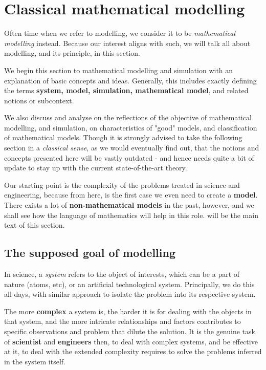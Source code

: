 \chapter{Classical mathematical modelling}
Often time when we refer to modelling, we consider it to be \textit{mathematical modelling} instead. Because our interest aligns with such, we will talk all about modelling, and its principle, in this section. 

We begin this section to mathematical modelling and simulation with an explanation of basic concepts and ideas. Generally, this includes exactly defining the terms \textbf{system, model, simulation, mathematical model}, and related notions or subcontext.  

We also discuss and analyse on the reflections of the objective of mathematical modelling, and simulation, on characteristics of "good" models, and classification of mathematical models. Though it is strongly advised to take the following section in a \textit{classical sense}, as we would eventually find out, that the notions and concepts presented here will be vastly outdated - and hence needs quite a bit of update to stay up with the current state-of-the-art theory. 

Our starting point is the complexity of the problems treated in science and engineering, because from here, is the first case we even need to create a \textbf{model}. There exists a lot of \textbf{non-mathematical models} in the past, however, and we shall see how the language of mathematics will help in this role. \cite{VeltenetalMathematicalModelling} will be the main text of this section. 

\section{The supposed goal of modelling}

In science, a \textit{system} refers to the object of interests, which can be a part of nature (atoms, etc), or an artificial technological system. Principally, we do this all days, with similar approach to isolate the problem into its respective system. 

The more \textbf{complex} a system is, the harder it is for dealing with the objects in that system, and the more intricate relationships and factors contributes to specific observations and problem that dilute the solution. It is the genuine task of \textbf{scientist} and \textbf{engineers} then, to deal with complex systems, and be effective at it, to deal with the extended complexity requires to solve the problems inferred in the system itself. 

